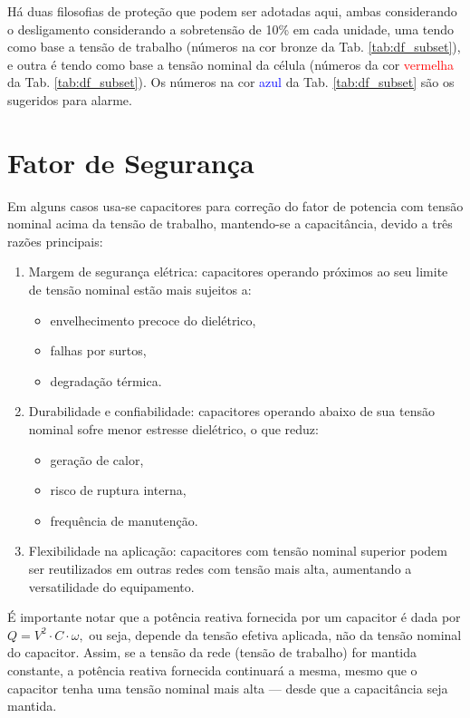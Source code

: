 \documentclass[a4paper]{article}
\begin{document}
Há duas filosofias de proteção que podem ser adotadas aqui, ambas considerando o desligamento considerando a sobretensão de 10\% em cada unidade, uma tendo como base a tensão de trabalho (números na cor \textcolor{yellow!50!black}{bronze} da Tab. \ref{tab:df_subset}), e outra é tendo como base a tensão nominal da célula (números da cor \textcolor{red}{vermelha} da Tab. \ref{tab:df_subset}). Os números na cor \textcolor{blue}{azul} da Tab. \ref{tab:df_subset} são os sugeridos para alarme.




\section{Fator de Segurança}

Em alguns casos usa-se capacitores para correção do fator de potencia com tensão nominal acima da tensão de trabalho, mantendo-se a capacitância, devido a três razões principais:
\begin{enumerate}
	\item Margem de segurança elétrica: capacitores operando próximos ao seu limite de tensão nominal estão mais sujeitos a:
	\begin{itemize}
		\item envelhecimento precoce do dielétrico,
		\item falhas por surtos,
		\item degradação térmica.
	\end{itemize}
	\item Durabilidade e confiabilidade: capacitores operando abaixo de sua tensão nominal sofre menor estresse dielétrico, o que reduz:
	\begin{itemize}
		\item geração de calor,
		\item risco de ruptura interna,
		\item frequência de manutenção.
	\end{itemize}
	\item Flexibilidade na aplicação: capacitores com tensão nominal superior podem ser reutilizados em outras redes com tensão mais alta, aumentando a versatilidade do equipamento.
\end{enumerate}

É importante notar que a potência reativa fornecida por um capacitor é dada por $Q = V^2 \cdot C \cdot \omega,$ ou seja, depende da tensão efetiva aplicada, não da tensão nominal do capacitor. Assim, se a tensão da rede (tensão de trabalho) for mantida constante, a potência reativa fornecida continuará a mesma, mesmo que o capacitor tenha uma tensão nominal mais alta — desde que a capacitância seja mantida.
  
\end{document}
